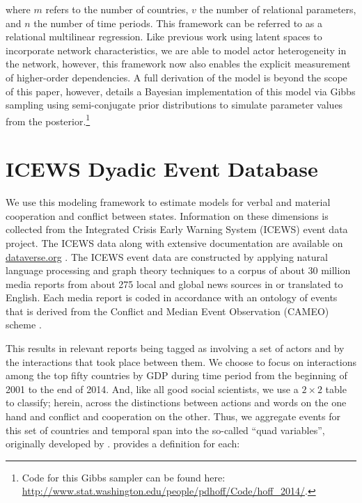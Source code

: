 \documentclass[3p,times,twocolumn,authoryear,12pt]{elsarticle}
\begin{document}
\noindent where $m$ refers to the number of countries, $v$ the number of relational parameters, and $n$ the number of time periods. This framework can be referred to as a relational multilinear regression. Like previous work using latent spaces to incorporate network characteristics, we are able to model actor heterogeneity in the network, however, this framework now also enables the explicit measurement of higher-order dependencies. A full derivation of the model is beyond the scope of this paper, however, \citet{hoff:2015} details a Bayesian implementation of this model via Gibbs sampling using semi-conjugate prior distributions to simulate parameter values from the posterior.\footnote{Code for this Gibbs sampler can be found here: \url{http://www.stat.washington.edu/people/pdhoff/Code/hoff_2014/}.}

\section{ICEWS Dyadic Event Database}

We use this modeling framework to estimate models for verbal and material cooperation and conflict between states. Information on these dimensions is collected from the Integrated Crisis Early Warning System (ICEWS) event data project. The ICEWS data along with extensive documentation are available on \url{dataverse.org} \citep{icews:2015:aggregations,icews:2015:data}. The ICEWS event data are constructed by applying natural language processing and graph theory techniques \citep{boschee:natarajan:etal:2013} to a corpus of about 30 million media reports from about 275 local and global news sources in or translated to English.  Each media report is coded in accordance with an ontology of events that is derived from the Conflict and Median Event Observation (CAMEO) scheme \citep{schrodt:etal:2009}. 


This results in relevant reports being tagged as involving a set of actors and by the interactions that took place between them. We choose to focus on interactions among the top fifty countries by GDP during time period from the beginning of 2001 to the end of 2014. And, like all good social scientists, we use a $2 \times 2$ table to classify; herein, across the distinctions between actions and words on the one hand and conflict and cooperation on the other.  Thus, we aggregate events for this set of countries and temporal span into the so-called ``quad variables'', originally developed by \citet{duval:thompson:1980}. \citet{yonamine:2011} provides a definition for each:
\end{document}
